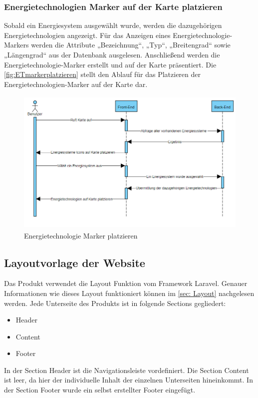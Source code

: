 \subsubsection{Energietechnologien Marker auf der Karte platzieren}
Sobald ein Energiesystem ausgewählt wurde, werden die dazugehörigen Energietechnologien angezeigt. Für das Anzeigen eines Energietechnologie-Markers werden die Attribute „Bezeichnung“, „Typ“, „Breitengrad“ sowie „Längengrad“ aus der Datenbank ausgelesen. Anschließend werden die Energietechnologie-Marker erstellt und auf der Karte präsentiert. Die \autoref{fig:ETmarkerplatzieren} stellt den Ablauf für das Platzieren der Energietechnologien-Marker auf der Karte dar.
\newline
\begin{figure}[h]
	\centering
	\includegraphics[height=7cm,width=14cm]{images/SetETMarker}
	\caption{Energietechnologie Marker platzieren}
	\label{fig:ETmarkerplatzieren}
\end{figure}

\newpage
\subsection{Layoutvorlage der Website}
Das Produkt verwendet die Layout Funktion vom Framework Laravel. Genauer Informationen wie dieses Layout funktioniert können im \autoref{sec: Layout} nachgelesen werden. Jede Unterseite des Produkts ist in folgende Sections gegliedert:
\begin{itemize}
	\item Header  
	\item Content
	\item Footer  
\end{itemize}

In der Section Header ist die Navigationsleiste vordefiniert. Die Section Content ist leer, da hier der individuelle Inhalt der einzelnen Unterseiten hineinkommt. In der Section Footer wurde ein selbst erstellter Footer eingefügt.





